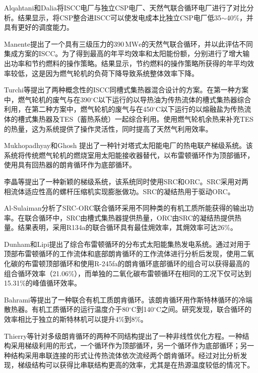 Alqahtani和Dalia\cite{Alqahtani2016}将ISCC电厂与独立CSP电厂、天然气联合循环电厂进行了对比分析。结果显示，将CSP整合进ISCC可以使发电成本比独立CSP电厂低35$\sim$40\%，并具有更好的调度能力。

Manente\cite{Manente2016}提出了一个具有三级压力的390$\,\mathrm{MWe}$的天然气联合循环，并以此评估不同集成方案的ISCC。为了得到最高的年平均效率和太阳能份额，分别进行了增大输出功率和节约燃料的操作策略。结果显示，节约燃料的操作策略所获得的年平均效率较低，这是因为燃气轮机的负荷下降导致系统整体效率下降。

Turchi等\cite{Turchi2014}提出了两种概念性的ISCC同槽式集热器混合设计的方案。在第一种方案中，燃气轮机的废气与在390$^\circ\mathrm{C}$以下运行的以导热油为传热流体的槽式集热器综合利用，在第二种方案中，燃气轮机的废气与在450$^\circ\mathrm{C}$以下运行的以熔融盐为传热流体的槽式集热器及TES（蓄热系统）一起综合利用。使用燃气轮机余热来补充TES的热量，这为系统提供了操作灵活性，同时提高了天然气利用效率。

Mukhopadhyay和Ghosh\cite{Mukhopadhyay2016}
提出了一种针对塔式太阳能电厂的热电联产梯级系统。该系统将传统燃气轮机的燃烧室用太阳能接收器替代，以布雷顿循环作为顶部循环，使用具有回热器的朗肯循环作为底部循环。

李晶等\cite{Li2016a}提出了一种新颖的梯级系统，该系统同时使用SRC和ORC。SRC采用对两相流体适应性高的螺杆压缩机实现膨胀做功。SRC的凝结热用于驱动ORC。

Al-Sulaiman\cite{AlSulaiman2014}分析了SRC-ORC联合循环采用不同种类的有机工质所能获得的输出功率。在联合循环中，SRC由槽式集热器提供热量，ORC由SRC的凝结热提供热量。结果表明，采用R134a的联合循环具有最佳㶲效率，其㶲效率可达26\%。

Dunham和Lipi\cite{Dunham2013}提出了综合布雷顿循环的分布式太阳能集热发电系统。通过对用于顶部布雷顿循环的工作流体和底部朗肯循环的工作流体进行分析后发现，使用二氧化碳的布雷顿顶部循环和使用R-245fa的朗肯循环底部循环的组合可以获得最高的组合循环效率（21.06\%），而单独的二氧化碳布雷顿循环在相同的工况下仅可达到15.31\%的峰值循环效率。

Bahrami等\cite{Bahrami2013}提出了一种联合有机工质朗肯循环。该朗肯循环用作斯特林循环的冷端散热器。有机工质循环的运行温度介于80$\mathrm{^\circ C}$到140$\mathrm{^\circ C}$之间。研究发现，联合循环的效率相比于独立的斯特林机可以提升4\%到8\%。

Thierry等\cite{Thierry2016}针对多级朗肯循环的两种不同结构提出了一种非线性优化方程。一种结构采用梯级利用的形式，一个循环作为顶部循环，另一个循环作为底部循环；另一种结构采用串联连接的形式让传热流体依次流经两个朗肯循环。经过对比分析发现，梯级结构可以获得比串联结构更高的效率，尤其是在热源温度较低的情况下。


